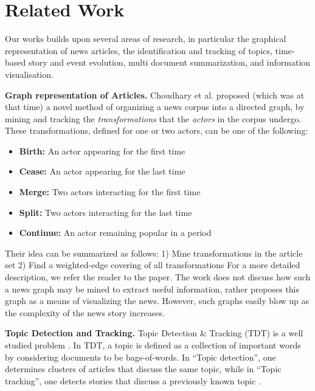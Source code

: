 \section{Related Work}
\label{sec:related}

Our works builds upon several areas of research, in particular the graphical representation of news articles, the identification and tracking of topics, time-based story and event evolution, multi document summarization, and information visualisation.

\textbf{Graph representation of Articles.} Choudhary et al.\cite{choudhary@ecir2008} proposed (which was at that time) a novel method of organizing a news corpus into a directed graph, by mining and tracking the \emph{transformations} that the \emph{actors} in the corpus undergo. These transformations, defined for one or two actors, can be one of the following:
\begin{itemize}
  \item \textbf{Birth:} An actor appearing for the first time
  \item \textbf{Cease:} An actor appearing for the last time
  \item \textbf{Merge:} Two actors interacting for the first time
  \item \textbf{Split:} Two actors interacting for the last time
  \item \textbf{Continue:} An actor remaining popular in a period
\end{itemize}
Their idea can be summarized as follows: 1) Mine transformations in the article set 2) Find a weighted-edge covering of all transformations
For a more detailed description, we refer the reader to the paper. The work does not discuss how such a news graph may be mined to extract
useful information, rather proposes this graph as a means of visualizing the news. However, such graphs easily blow up as the complexity
of the news story increases. 

\textbf{Topic Detection and Tracking.} Topic Detection \& Tracking (TDT) is a well studied problem \cite{springerlink:10.1023/B:INRT.0000011210.12953.86, springerlink:10.1007, Franz:2001:USC:383952.384013}. In TDT, a topic is defined as a collection of important words by considering documents to be bags-of-words. In ``Topic detection'', one determines clusters of articles that discuss the same topic, while in ``Topic tracking'', one detects stories that discuss a previously known topic \cite{Allan:2002:TDT:772260}. 

